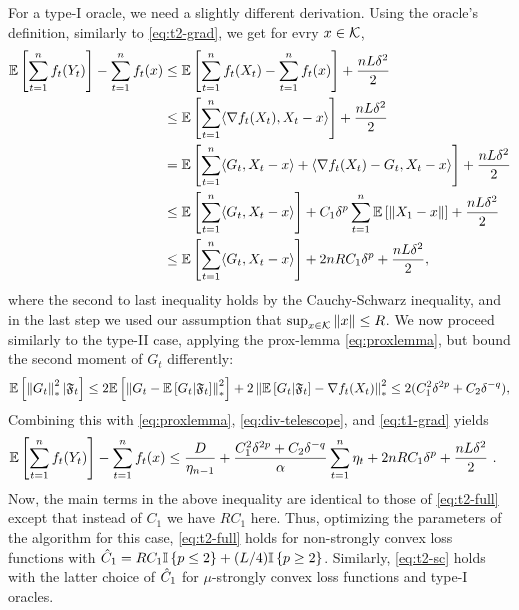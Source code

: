 For a type-I oracle, we need a slightly different derivation. Using the oracle's definition, similarly to \eqref{eq:t2-grad}, we get for evry $x \in \mathcal{K}$,
\begin{align}
\mathbb{E}\left[\sum_{t=1}^n f_t(Y_t)\right] - \sum_{t=1}^n f_t(x) 
& \le \mathbb{E}\left[\sum_{t=1}^n f_t(X_t) -  \sum_{t=1}^n f_t(x)\right] + \frac{n L \delta^2}{2} \nonumber \\
& \le \mathbb{E}\left[\sum_{t=1}^n \langle \nabla f_t(X_t), X_t-x  \rangle\right] + \frac{n L \delta^2}{2} \nonumber \\
& = \mathbb{E}\left[\sum_{t=1}^n \langle G_t, X_t-x  \rangle + \langle \nabla f_t(X_t)-G_t,X_t-x \rangle\right] + \frac{n L \delta^2}{2}  \nonumber \\
& \le \mathbb{E}\left[\sum_{t=1}^n \langle G_t, X_t-x  \rangle\right] + C_1 \delta^p \sum_{t=1}^n \mathbb{E}\left[\|X_1-x\|\right] +  \frac{n L \delta^2}{2} \nonumber \\
& \le \mathbb{E}\left[\sum_{t=1}^n \langle G_t, X_t-x  \rangle\right]  + 2 n R C_1 \delta^p +  \frac{n L \delta^2}{2},
\label{eq:t1-grad}
\end{align}
where the second to last inequality holds by the Cauchy-Schwarz inequality, and in the last step we used our assumption that $\sup_{x \in \mathcal{K}} \|x\| \le R$. We now proceed similarly to the type-II case, applying the prox-lemma \eqref{eq:proxlemma}, but bound the second moment of $G_t$ differently:
\begin{equation}
\label{eq:t1-g2}
\mathbb{E}\left[\left\|G_t\right\|_*^2 | \mathfrak{F}_t\right] \le 2\mathbb{E}\left[\left\|G_t - \mathbb{E}\left[G_t | \mathfrak{F}_t\right]\right\|_*^2\right] + 2 \left\|\mathbb{E}\left[G_t|\mathfrak{F}_t\right]-\nabla f_t(X_t)\right\|_*^2 
\le 2(C_1^2 \delta^{2p}+ C_2 \delta^{-q}),
\end{equation}
Combining  this with \eqref{eq:proxlemma}, \eqref{eq:div-telescope}, and \eqref{eq:t1-grad} yields
\begin{align*}
\mathbb{E}\left[\sum_{t=1}^n f_t(Y_t)\right] - \sum_{t=1}^n f_t(x) 
& \le \frac{D}{\eta_{n-1}}+   \frac{C_1^2 \delta^{2p}+ C_2 \delta^{-q}}{\alpha} \sum_{t=1}^n \eta_t + 2 n R C_1 \delta^p +  \frac{n L \delta^2}{2} ~.
\end{align*}
Now, the main terms in the above inequality are identical to those of \eqref{eq:t2-full} except that instead of $C_1$ we have $RC_1$ here. Thus, optimizing the parameters of the algorithm for this case, \eqref{eq:t2-full} holds for non-strongly convex loss functions with $\hat{C}_1=R C_1 \mathbb{I}\left\{p \le 2\right\} + (L/4) \mathbb{I}\left\{p \ge 2\right\}$. Similarly, \eqref{eq:t2-sc} holds with the latter choice of $\hat{C}_1$ for $\mu$-strongly convex loss functions and type-I oracles.




